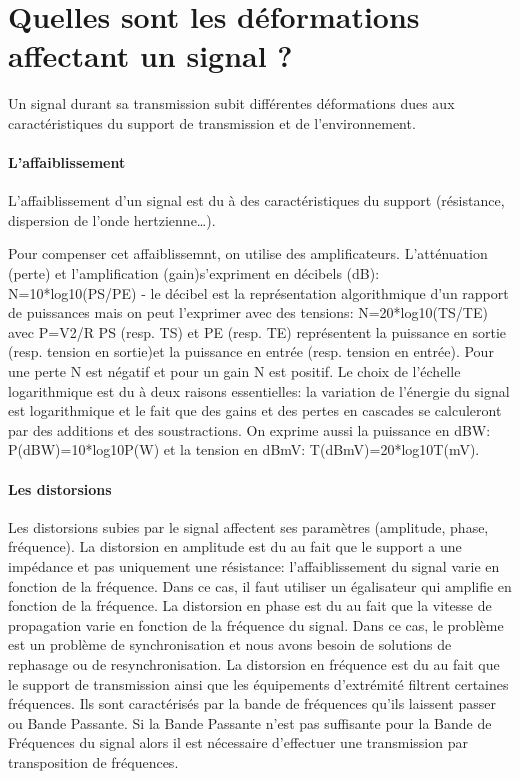 \section{Quelles sont les déformations affectant un signal ?}
Un signal durant sa transmission subit différentes déformations dues aux caractéristiques du
support de transmission et de l'environnement.

\paragraph{L'affaiblissement} L'affaiblissement d'un signal est du à des caractéristiques du support
(résistance, dispersion de l'onde hertzienne\ldots).

Pour compenser cet affaiblissemnt, on utilise des amplificateurs. L'atténuation (perte) et
l'amplification (gain)s'expriment en décibels (dB): N=10*log10(PS/PE) - le décibel est la
représentation algorithmique d'un rapport de puissances mais on peut l'exprimer avec des
tensions: N=20*log10(TS/TE) avec P=V2/R
PS (resp. TS) et PE (resp. TE) représentent la puissance en sortie (resp. tension en sortie)et
la puissance en entrée (resp. tension en entrée). Pour une perte N est négatif et pour un gain
N est positif.
Le choix de l'échelle logarithmique est du à deux raisons essentielles: la variation de
l'énergie du signal est logarithmique et le fait que des gains et des pertes en cascades se
calculeront par des additions et des soustractions.
On exprime aussi la puissance en dBW: P(dBW)=10*log10P(W) et la tension en dBmV:
T(dBmV)=20*log10T(mV).

\paragraph{Les distorsions} Les distorsions subies par le signal affectent ses paramètres (amplitude,
phase, fréquence). 
La distorsion en amplitude est du au fait que le support a une impédance et pas uniquement une
résistance: l'affaiblissement du signal varie en fonction de la fréquence. Dans ce cas, il
faut utiliser un égalisateur qui amplifie en fonction de la fréquence.
La distorsion en phase est du au fait que la vitesse de propagation varie en fonction de la
fréquence du signal. Dans ce cas, le problème est un problème de synchronisation et nous avons
besoin de solutions de rephasage ou de resynchronisation.
La distorsion en fréquence est du au fait que le support de transmission ainsi que les
équipements d'extrémité filtrent certaines fréquences. Ils sont caractérisés par la bande de
fréquences qu'ils laissent passer ou Bande Passante. Si la Bande Passante n'est pas suffisante
pour la Bande de Fréquences du signal alors il est nécessaire d'effectuer une transmission par
transposition de fréquences.

